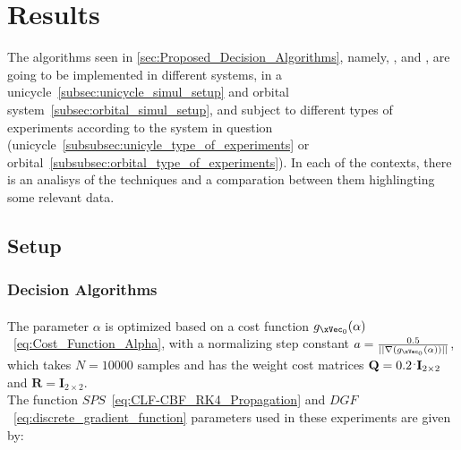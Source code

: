 
%


\chapter{Results}
\label{cha:results}

The algorithms seen in \ref{sec:Proposed_Decision_Algorithms}, namely, \label{subsec:decision_algorithms} ,  and ,  are going to be implemented in different systems, in a unicycle~\ref{subsec:unicycle_simul_setup} and orbital system~\ref{subsec:orbital_simul_setup}, and subject to different types of experiments according to the system in question (unicycle~\ref{subsubsec:unicyle_type_of_experiments} or orbital~\ref{subsubsec:orbital_type_of_experiments}). In each of the contexts, there is an analisys of the techniques and a comparation between them highlingting some relevant data.

\section{Setup}
\label{sec:setup}

\subsection{Decision Algorithms}
\label{subsec:decision_algorithms}

\subsubsection{}
\label{subsubsec:A-JO_parameters}

The parameter \(\alpha\) is optimized based on a cost function \(g_{\xVec_0}(\alpha)\)~\ref{eq:Cost_Function_Alpha}, with a normalizing step constant \(a = \frac{0.5}{||\nabla(g_{\xVec_0}(\alpha))||}\), which takes \(N=10000\) samples and has the weight cost matrices \(\mathbf{Q} = 0.2\hspace{0.1em}^.\mathbf{I}_{2\times 2} \) and \(\mathbf{R} = \mathbf{I}_{2\times 2} \).\\

The function \(SPS\)~\ref{eq:CLF-CBF_RK4_Propagation} and \(DGF\)~\ref{eq:discrete_gradient_function} parameters used in these experiments are given by:


